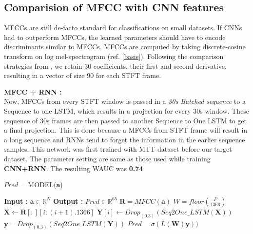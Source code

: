 \subsection{Comparision of MFCC with CNN features}    
\label{mfcc}  
MFCCs are still de-facto standard for classifications on small datasets. If CNNs had to outperform MFCCs, the learned parameters should have to encode discriminants similar to MFCCs. MFCCs are computed by taking discrete-cosine transform on log mel-spectrogram (ref. \ref{basis}). Following the comparison strategies from \cite{choi_cnn}, we retain 30 coefficients, their first and second derivative, resulting in a vector of size 90 for each STFT frame.
\bigskip

\noindent \textbf{MFCC + RNN :}\\
Now, MFCCs from every STFT window is passed in a \textit{30s  Batched sequence} to a Sequence to one LSTM, which results in a projection for every 30s window. These sequence of 30s frames are then passed to another Sequence to One LSTM to get a final projection. This is done because a MFCCs from STFT frame will result in a long sequence and RNNs tend to forget the information in the earlier sequence samples. This network was first trained with MTT dataset before our target dataset. The parameter setting are same as those used while training \textbf{CNN+RNN}. The resulting WAUC was \textbf{0.74}   
\begin{algorithm}
  \caption{$Pred$ = MODEL($\textbf{a}$) }\label{alg:mfccrnn}
  \begin{algorithmic}[1]
    \Statex \textbf{Input :} $\textbf{a} \in \mathbb{R}^{N}$
    \Statex \textbf{Output :} $Pred \in \mathbb{R}^{65}$ 
    \State $\textbf{R} = MFCC(\textbf{a})$ 
        \State $W = floor(\frac{P}{1366})$
      \State $\textbf{X} \leftarrow \textbf{R}[:][i:(i+1).1366]$ 
    \State $\textbf{Y}[i] \leftarrow Drop_{(0.3)}(Seq2One\_LSTM(\textbf{X}))$ 
    \EndFor
    \State $\textbf{y} = Drop_{(0.3)}(Seq2One\_LSTM(\textbf{Y}))$ 
    \State $Pred = \sigma(L(\textbf{W})\textbf{y}))$ 
  \end{algorithmic}
\end{algorithm}
\FloatBarrier

